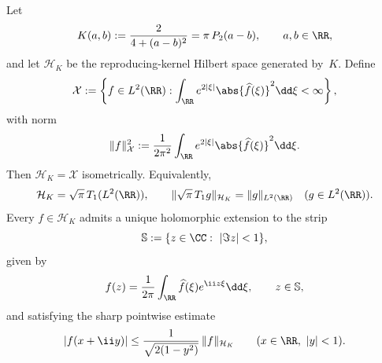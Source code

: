 \begin{proposition}%
\label{thm:gram-space-poisson-image}
Let
\[
K(a,b):=\frac{2}{4+(a-b)^2}=\pi\,P_2(a-b),
\qquad a,b\in\RR,
\]
and let $\mathcal H_K$ be the reproducing-kernel Hilbert space generated
by~$K$.  Define
\[
\mathcal X
:=
\left\{
f\in L^2(\RR):
\int_{\RR}e^{2|\xi|}\abs{\widehat f(\xi)}^2\dd\xi<\infty
\right\},
\]
with norm
\[
\|f\|_{\mathcal X}^2
:=\frac{1}{2\pi^2}\int_{\RR}e^{2|\xi|}\abs{\widehat f(\xi)}^2\dd\xi.
\]
Then $\mathcal H_K=\mathcal X$ isometrically.  Equivalently,
\[
\mathcal H_K=\sqrt{\pi}\,T_1(L^2(\RR)),
\qquad
\|\sqrt{\pi}\,T_1 g\|_{\mathcal H_K}=\|g\|_{L^2(\RR)}
\quad(g\in L^2(\RR)).
\]
Every $f\in\mathcal H_K$ admits a unique holomorphic extension to the
strip
\[
\mathbb S:=\{z\in\CC:\ |\Im z|<1\},
\]
given by
\[
f(z)=\frac{1}{2\pi}\int_{\RR}\widehat f(\xi)e^{\ii z\xi}\dd\xi,
\qquad z\in\mathbb S,
\]
and satisfying the sharp pointwise estimate
\[
|f(x+\ii y)|\le \frac{1}{\sqrt{2(1-y^2)}}\,\|f\|_{\mathcal H_K}
\qquad(x\in\RR,\ |y|<1).
\]
\end{proposition}

